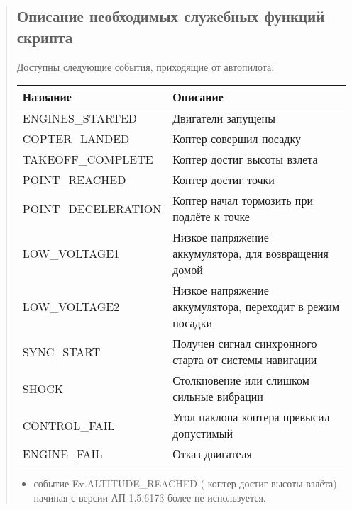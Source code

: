 \documentclass[a4paper,10pt,russian]{sphinxmanual}
\begin{document}
\begin{quote}
\begin{sphinxVerbatim}[commandchars=\\\{\}]
    
    
         
\end{sphinxVerbatim}


\subsection{Описание необходимых служебных функций скрипта}
\label{\detokenize{programming/lua/lua:id5}}
%
\begin{sphinxVerbatim}[commandchars=\\\{\}]
  
\end{sphinxVerbatim}

Доступны следующие события, приходящие от автопилота:


\begin{savenotes}\sphinxattablestart
\centering
\begin{tabulary}{\linewidth}[t]{|T|T|}
\hline
\sphinxstyletheadfamily 
Название
&\sphinxstyletheadfamily 
Описание
\\
\hline
ENGINES\_STARTED
&
Двигатели запущены
\\
\hline
COPTER\_LANDED
&
Коптер совершил посадку
\\
\hline
TAKEOFF\_COMPLETE
&
Коптер достиг высоты взлета
\\
\hline
POINT\_REACHED
&
Коптер достиг точки
\\
\hline
POINT\_DECELERATION
&
Коптер начал тормозить при подлёте к точке
\\
\hline
LOW\_VOLTAGE1
&
Низкое напряжение аккумулятора, для возвращения домой
\\
\hline
LOW\_VOLTAGE2
&
Низкое напряжение аккумулятора, переходит в режим посадки
\\
\hline
SYNC\_START
&
Получен сигнал синхронного старта от системы навигации
\\
\hline
SHOCK
&
Столкновение или слишком сильные вибрации
\\
\hline
CONTROL\_FAIL
&
Угол наклона коптера превысил допустимый
\\
\hline
ENGINE\_FAIL
&
Отказ двигателя
\\
\hline
\end{tabulary}
\par
\sphinxattableend\end{savenotes}
\begin{itemize}
\item {} 
событие Ev.ALTITUDE\_REACHED ( коптер достиг высоты взлёта) начиная с версии АП 1.5.6173 более не используется.


\end{itemize}
\end{quote}
\end{document}
